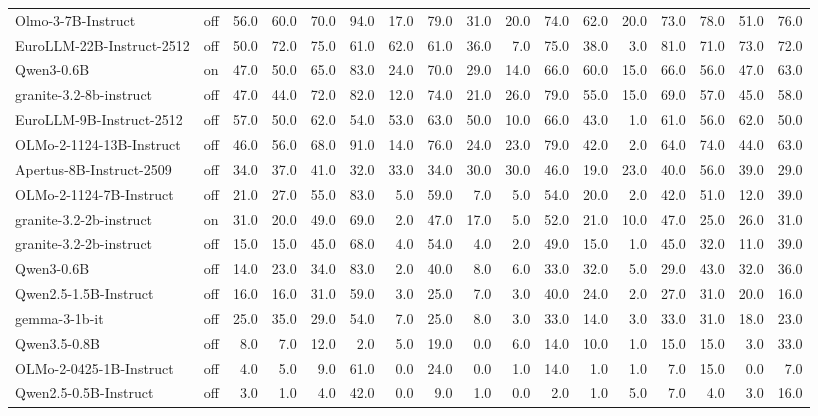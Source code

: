 \begin{table}
{\begin{tabular}{llrrrrrrrrrrrrrrr}
Olmo-3-7B-Instruct & off & 56.0 & 60.0 & 70.0 & 94.0 & 17.0 & 79.0 & 31.0 & 20.0 & 74.0 & 62.0 & 20.0 & 73.0 & 78.0 & 51.0 & 76.0 \\
EuroLLM-22B-Instruct-2512 & off & 50.0 & 72.0 & 75.0 & 61.0 & 62.0 & 61.0 & 36.0 & 7.0 & 75.0 & 38.0 & 3.0 & 81.0 & 71.0 & 73.0 & 72.0 \\
Qwen3-0.6B & on & 47.0 & 50.0 & 65.0 & 83.0 & 24.0 & 70.0 & 29.0 & 14.0 & 66.0 & 60.0 & 15.0 & 66.0 & 56.0 & 47.0 & 63.0 \\
granite-3.2-8b-instruct & off & 47.0 & 44.0 & 72.0 & 82.0 & 12.0 & 74.0 & 21.0 & 26.0 & 79.0 & 55.0 & 15.0 & 69.0 & 57.0 & 45.0 & 58.0 \\
EuroLLM-9B-Instruct-2512 & off & 57.0 & 50.0 & 62.0 & 54.0 & 53.0 & 63.0 & 50.0 & 10.0 & 66.0 & 43.0 & 1.0 & 61.0 & 56.0 & 62.0 & 50.0 \\
OLMo-2-1124-13B-Instruct & off & 46.0 & 56.0 & 68.0 & 91.0 & 14.0 & 76.0 & 24.0 & 23.0 & 79.0 & 42.0 & 2.0 & 64.0 & 74.0 & 44.0 & 63.0 \\
Apertus-8B-Instruct-2509 & off & 34.0 & 37.0 & 41.0 & 32.0 & 33.0 & 34.0 & 30.0 & 30.0 & 46.0 & 19.0 & 23.0 & 40.0 & 56.0 & 39.0 & 29.0 \\
OLMo-2-1124-7B-Instruct & off & 21.0 & 27.0 & 55.0 & 83.0 & 5.0 & 59.0 & 7.0 & 5.0 & 54.0 & 20.0 & 2.0 & 42.0 & 51.0 & 12.0 & 39.0 \\
granite-3.2-2b-instruct & on & 31.0 & 20.0 & 49.0 & 69.0 & 2.0 & 47.0 & 17.0 & 5.0 & 52.0 & 21.0 & 10.0 & 47.0 & 25.0 & 26.0 & 31.0 \\
granite-3.2-2b-instruct & off & 15.0 & 15.0 & 45.0 & 68.0 & 4.0 & 54.0 & 4.0 & 2.0 & 49.0 & 15.0 & 1.0 & 45.0 & 32.0 & 11.0 & 39.0 \\
Qwen3-0.6B & off & 14.0 & 23.0 & 34.0 & 83.0 & 2.0 & 40.0 & 8.0 & 6.0 & 33.0 & 32.0 & 5.0 & 29.0 & 43.0 & 32.0 & 36.0 \\
Qwen2.5-1.5B-Instruct & off & 16.0 & 16.0 & 31.0 & 59.0 & 3.0 & 25.0 & 7.0 & 3.0 & 40.0 & 24.0 & 2.0 & 27.0 & 31.0 & 20.0 & 16.0 \\
gemma-3-1b-it & off & 25.0 & 35.0 & 29.0 & 54.0 & 7.0 & 25.0 & 8.0 & 3.0 & 33.0 & 14.0 & 3.0 & 33.0 & 31.0 & 18.0 & 23.0 \\
Qwen3.5-0.8B & off & 8.0 & 7.0 & 12.0 & 2.0 & 5.0 & 19.0 & 0.0 & 6.0 & 14.0 & 10.0 & 1.0 & 15.0 & 15.0 & 3.0 & 33.0 \\
OLMo-2-0425-1B-Instruct & off & 4.0 & 5.0 & 9.0 & 61.0 & 0.0 & 24.0 & 0.0 & 1.0 & 14.0 & 1.0 & 1.0 & 7.0 & 15.0 & 0.0 & 7.0 \\
Qwen2.5-0.5B-Instruct & off & 3.0 & 1.0 & 4.0 & 42.0 & 0.0 & 9.0 & 1.0 & 0.0 & 2.0 & 1.0 & 5.0 & 7.0 & 4.0 & 3.0 & 16.0 \\

\end{tabular}}
\end{table}
